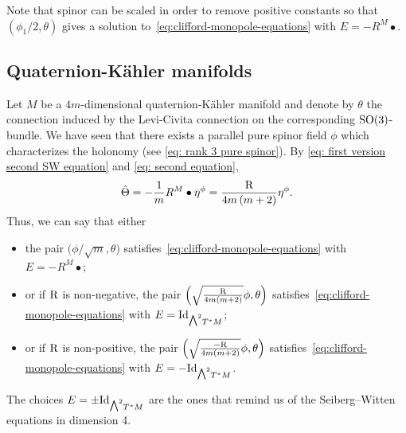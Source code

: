 \documentclass[10pt,a4paper]{amsart}
\newcommand{\ext}{\raise1pt\hbox{\small$\bigwedge$}}
\numberwithin{equation}{section}
\begin{document}
\begin{Remark}Note that spinor can be scaled in order to remove positive constants so that $(\phi_1/2,\theta)$ gives a solution to~\eqref{eq:clifford-monopole-equations} with $E=-R^M\bullet$.
\end{Remark}

\subsection{Quaternion-K\"ahler manifolds}
Let $M$ be a $4m$-dimensional quaternion-K\"ahler manifold and denote by $\theta$ the connection induced by the Levi-Civita connection on the corresponding ${\rm SO}(3)$-bundle.
We have seen that there exists a parallel pure spinor field $\phi$ which characterizes the holonomy (see \eqref{eq: rank 3 pure spinor}).
By \eqref{eq: first version second SW equation} and \eqref{eq: second equation},
\begin{gather*}
\hat\Theta = -{1\over m}R^M\bullet \eta^{\phi}= {{\rm R}\over 4m\left(m+2\right)} \eta^{\phi} .
\end{gather*}
Thus, we can say that either
\begin{itemize}\itemsep=0pt
\item the pair $\big( \phi/\sqrt{m},\theta\big)$ satisfies~\eqref{eq:clifford-monopole-equations} with $E=-R^M\bullet$;
\item or if ${\rm R}$ is non-negative, the pair $\Big( \sqrt{{\rm R}\over 4m(m+2)}\phi,\theta\Big)$ satisfies~\eqref{eq:clifford-monopole-equations} with $E={\rm Id}_{\ext^2 T^*M}$;
\item or if ${\rm R}$ is non-positive, the pair $\Big( \sqrt{-{\rm R}\over 4m(m+2)}\phi,\theta\Big)$ satisfies~\eqref{eq:clifford-monopole-equations} with $E=-{\rm Id}_{\ext^2 T^*M}$.
\end{itemize}

\begin{Remark}The choices $E=\pm{\rm Id}_{\ext^2 T^*M}$ are the ones that remind us of the Seiberg--Witten equations in dimension 4.
\end{Remark}
\end{document}
